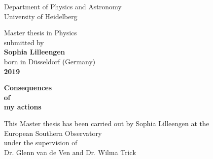 
\begin{titlepage}
\thispagestyle{empty}
\begin{center}
  \renewcommand{\baselinestretch}{2.00}
  \Large\sffamily
  Department of Physics and Astronomy\\
  \large University of Heidelberg
  \par\vfill\normalfont
  Master thesis in Physics\\
  submitted by\\
  \textbf{Sophia Lilleengen}\\
  born in D\"usseldorf (Germany)\\
  \textbf{2019}
\end{center}
\newpage
\thispagestyle{empty}
\mbox{}
\newpage
\thispagestyle{empty}
\begin{center}
  \renewcommand{\baselinestretch}{2.00}
  \Large\bfseries\sffamily
    Consequences\\
    of\\
    my actions
  \par
  \vfill
  \large\normalfont
  This Master thesis has been carried out by Sophia Lilleengen at the\\
  European Southern Observatory\\
  under the supervision of\\
  Dr. Glenn van de Ven and Dr. Wilma Trick
\end{center}\par
\vspace{5\baselineskip}

\renewcommand{\baselinestretch}{1.00}\normalsize
\end{titlepage}